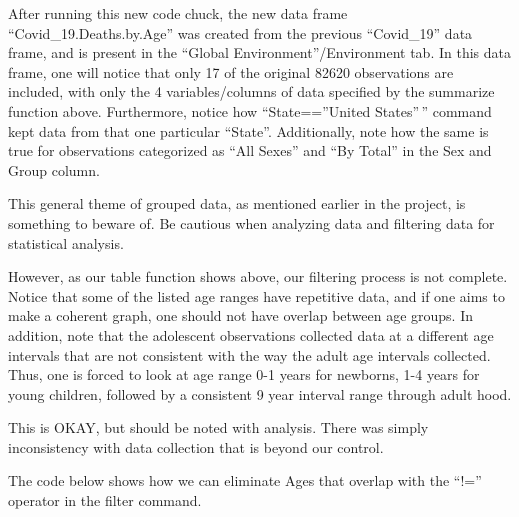 \documentclass[
]{article}
\newenvironment{Shaded}{\begin{snugshade}}{\end{snugshade}}
\newcommand{\CommentTok}[1]{\textcolor[rgb]{0.56,0.35,0.01}{\textit{#1}}}
\newcommand{\FunctionTok}[1]{\textcolor[rgb]{0.00,0.00,0.00}{#1}}
\newcommand{\NormalTok}[1]{#1}
\newcommand{\OtherTok}[1]{\textcolor[rgb]{0.56,0.35,0.01}{#1}}
\newcommand{\SpecialCharTok}[1]{\textcolor[rgb]{0.00,0.00,0.00}{#1}}
\newcommand{\StringTok}[1]{\textcolor[rgb]{0.31,0.60,0.02}{#1}}
\begin{document}
After running this new code chuck, the new data frame
``Covid\_19.Deaths.by.Age'' was created from the previous ``Covid\_19''
data frame, and is present in the ``Global Environment''/Environment
tab. In this data frame, one will notice that only 17 of the original
82620 observations are included, with only the 4 variables/columns of
data specified by the summarize function above. Furthermore, notice how
``State==''United States''\,'' command kept data from that one
particular ``State''. Additionally, note how the same is true for
observations categorized as ``All Sexes'' and ``By Total'' in the Sex
and Group column.

This general theme of grouped data, as mentioned earlier in the project,
is something to beware of. Be cautious when analyzing data and filtering
data for statistical analysis.

However, as our table function shows above, our filtering process is not
complete. Notice that some of the listed age ranges have repetitive
data, and if one aims to make a coherent graph, one should not have
overlap between age groups. In addition, note that the adolescent
observations collected data at a different age intervals that are not
consistent with the way the adult age intervals collected. Thus, one is
forced to look at age range 0-1 years for newborns, 1-4 years for young
children, followed by a consistent 9 year interval range through adult
hood.

This is OKAY, but should be noted with analysis. There was simply
inconsistency with data collection that is beyond our control.

The code below shows how we can eliminate Ages that overlap with the
``!='' operator in the filter command.

\begin{Shaded}
\end{Shaded}
\end{document}
